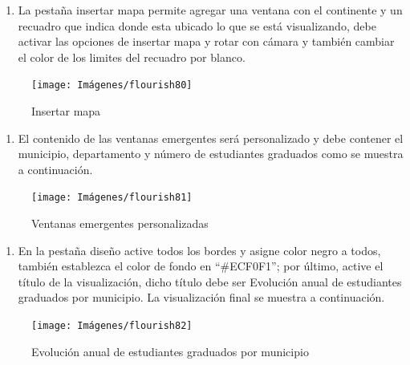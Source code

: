 \documentclass[
]{book}
\providecommand{\tightlist}{%
  \setlength{\itemsep}{0pt}\setlength{\parskip}{0pt}}
\begin{document}
\begin{enumerate}
\def\labelenumi{\arabic{enumi}.}
\setcounter{enumi}{9}
\tightlist
\item
  La pestaña insertar mapa permite agregar una ventana con el continente y un recuadro que indica donde esta ubicado lo que se está visualizando, debe activar las opciones de insertar mapa y rotar con cámara y también cambiar el color de los limites del recuadro por blanco.
\end{enumerate}

\begin{figure}

{\centering \texttt{[image: Imágenes/flourish80]} 

}

\caption{Insertar mapa}\label{fig:paso10mapa3dflourish-fig}
\end{figure}

\begin{enumerate}
\def\labelenumi{\arabic{enumi}.}
\setcounter{enumi}{10}
\tightlist
\item
  El contenido de las ventanas emergentes será personalizado y debe contener el municipio, departamento y número de estudiantes graduados como se muestra a continuación.
\end{enumerate}

\begin{figure}

{\centering \texttt{[image: Imágenes/flourish81]} 

}

\caption{Ventanas emergentes personalizadas}\label{fig:paso11mapa3dflourish-fig}
\end{figure}

\begin{enumerate}
\def\labelenumi{\arabic{enumi}.}
\setcounter{enumi}{11}
\tightlist
\item
  En la pestaña diseño active todos los bordes y asigne color negro a todos, también establezca el color de fondo en ``\#ECF0F1''; por último, active el título de la visualización, dicho título debe ser Evolución anual de estudiantes graduados por municipio. La visualización final se muestra a continuación.
\end{enumerate}

\begin{figure}

{\centering \texttt{[image: Imágenes/flourish82]} 

}

\caption{Evolución anual de estudiantes graduados por municipio}\label{fig:finalmapa3dflourish-fig}
\end{figure}
\end{document}
